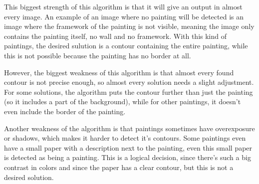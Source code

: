 This biggest strength of this algorithm is that it will give an output in almost every image. An example of an image where no painting will be detected is an image where the framework of the painting is not visible, meaning the image only contains the painting itself, no wall and no framework. With this kind of paintings, the desired sulution is a contour containing the entire painting, while this is not possible because the painting has no border at all.

However, the biggest weakness of this algorithm is that almost every found contour is not precise enough, so almost every solution needs a slight adjustment. For some solutions, the algorithm puts the contour further than just the painting (so it includes a part of the background), while for other paintings, it doesn't even include the border of the painting.

Another weakness of the algorithm is that paintings sometimes have overexposure or shadows, which makes it harder to detect it's contours. Some paintings even have a small paper with a description next to the painting, even this small paper is detected as being a painting. This is a logical decision, since there's such a big contrast in colors and since the paper has a clear contour, but this is not a desired solution.

